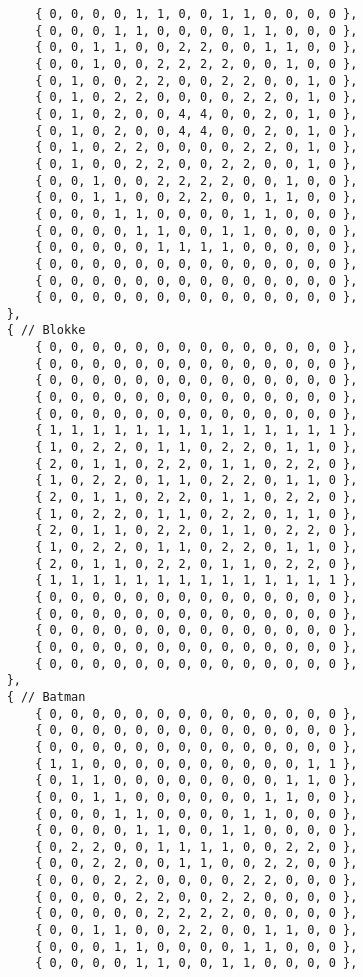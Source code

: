 \begin{lstlisting}
		{ 0, 0, 0, 0, 1, 1, 0, 0, 1, 1, 0, 0, 0, 0 },
		{ 0, 0, 0, 1, 1, 0, 0, 0, 0, 1, 1, 0, 0, 0 },
		{ 0, 0, 1, 1, 0, 0, 2, 2, 0, 0, 1, 1, 0, 0 },
		{ 0, 0, 1, 0, 0, 2, 2, 2, 2, 0, 0, 1, 0, 0 },
		{ 0, 1, 0, 0, 2, 2, 0, 0, 2, 2, 0, 0, 1, 0 },
		{ 0, 1, 0, 2, 2, 0, 0, 0, 0, 2, 2, 0, 1, 0 },
		{ 0, 1, 0, 2, 0, 0, 4, 4, 0, 0, 2, 0, 1, 0 },
		{ 0, 1, 0, 2, 0, 0, 4, 4, 0, 0, 2, 0, 1, 0 },
		{ 0, 1, 0, 2, 2, 0, 0, 0, 0, 2, 2, 0, 1, 0 },
		{ 0, 1, 0, 0, 2, 2, 0, 0, 2, 2, 0, 0, 1, 0 },
		{ 0, 0, 1, 0, 0, 2, 2, 2, 2, 0, 0, 1, 0, 0 },
		{ 0, 0, 1, 1, 0, 0, 2, 2, 0, 0, 1, 1, 0, 0 },
		{ 0, 0, 0, 1, 1, 0, 0, 0, 0, 1, 1, 0, 0, 0 },
		{ 0, 0, 0, 0, 1, 1, 0, 0, 1, 1, 0, 0, 0, 0 },
		{ 0, 0, 0, 0, 0, 1, 1, 1, 1, 0, 0, 0, 0, 0 },
		{ 0, 0, 0, 0, 0, 0, 0, 0, 0, 0, 0, 0, 0, 0 },
		{ 0, 0, 0, 0, 0, 0, 0, 0, 0, 0, 0, 0, 0, 0 },
		{ 0, 0, 0, 0, 0, 0, 0, 0, 0, 0, 0, 0, 0, 0 },
	},
	{ // Blokke
		{ 0, 0, 0, 0, 0, 0, 0, 0, 0, 0, 0, 0, 0, 0 },
		{ 0, 0, 0, 0, 0, 0, 0, 0, 0, 0, 0, 0, 0, 0 },
		{ 0, 0, 0, 0, 0, 0, 0, 0, 0, 0, 0, 0, 0, 0 },
		{ 0, 0, 0, 0, 0, 0, 0, 0, 0, 0, 0, 0, 0, 0 },
		{ 0, 0, 0, 0, 0, 0, 0, 0, 0, 0, 0, 0, 0, 0 },
		{ 1, 1, 1, 1, 1, 1, 1, 1, 1, 1, 1, 1, 1, 1 },
		{ 1, 0, 2, 2, 0, 1, 1, 0, 2, 2, 0, 1, 1, 0 },
		{ 2, 0, 1, 1, 0, 2, 2, 0, 1, 1, 0, 2, 2, 0 },
		{ 1, 0, 2, 2, 0, 1, 1, 0, 2, 2, 0, 1, 1, 0 },
		{ 2, 0, 1, 1, 0, 2, 2, 0, 1, 1, 0, 2, 2, 0 },
		{ 1, 0, 2, 2, 0, 1, 1, 0, 2, 2, 0, 1, 1, 0 },
		{ 2, 0, 1, 1, 0, 2, 2, 0, 1, 1, 0, 2, 2, 0 },
		{ 1, 0, 2, 2, 0, 1, 1, 0, 2, 2, 0, 1, 1, 0 },
		{ 2, 0, 1, 1, 0, 2, 2, 0, 1, 1, 0, 2, 2, 0 },
		{ 1, 1, 1, 1, 1, 1, 1, 1, 1, 1, 1, 1, 1, 1 },
		{ 0, 0, 0, 0, 0, 0, 0, 0, 0, 0, 0, 0, 0, 0 },
		{ 0, 0, 0, 0, 0, 0, 0, 0, 0, 0, 0, 0, 0, 0 },
		{ 0, 0, 0, 0, 0, 0, 0, 0, 0, 0, 0, 0, 0, 0 },
		{ 0, 0, 0, 0, 0, 0, 0, 0, 0, 0, 0, 0, 0, 0 },
		{ 0, 0, 0, 0, 0, 0, 0, 0, 0, 0, 0, 0, 0, 0 },
	},
	{ // Batman
		{ 0, 0, 0, 0, 0, 0, 0, 0, 0, 0, 0, 0, 0, 0 },
		{ 0, 0, 0, 0, 0, 0, 0, 0, 0, 0, 0, 0, 0, 0 },
		{ 0, 0, 0, 0, 0, 0, 0, 0, 0, 0, 0, 0, 0, 0 },
		{ 1, 1, 0, 0, 0, 0, 0, 0, 0, 0, 0, 0, 1, 1 },
		{ 0, 1, 1, 0, 0, 0, 0, 0, 0, 0, 0, 1, 1, 0 },
		{ 0, 0, 1, 1, 0, 0, 0, 0, 0, 0, 1, 1, 0, 0 },
		{ 0, 0, 0, 1, 1, 0, 0, 0, 0, 1, 1, 0, 0, 0 },
		{ 0, 0, 0, 0, 1, 1, 0, 0, 1, 1, 0, 0, 0, 0 },
		{ 0, 2, 2, 0, 0, 1, 1, 1, 1, 0, 0, 2, 2, 0 },
		{ 0, 0, 2, 2, 0, 0, 1, 1, 0, 0, 2, 2, 0, 0 },
		{ 0, 0, 0, 2, 2, 0, 0, 0, 0, 2, 2, 0, 0, 0 },
		{ 0, 0, 0, 0, 2, 2, 0, 0, 2, 2, 0, 0, 0, 0 },
		{ 0, 0, 0, 0, 0, 2, 2, 2, 2, 0, 0, 0, 0, 0 },
		{ 0, 0, 1, 1, 0, 0, 2, 2, 0, 0, 1, 1, 0, 0 },
		{ 0, 0, 0, 1, 1, 0, 0, 0, 0, 1, 1, 0, 0, 0 },
		{ 0, 0, 0, 0, 1, 1, 0, 0, 1, 1, 0, 0, 0, 0 },

\end{lstlisting}
